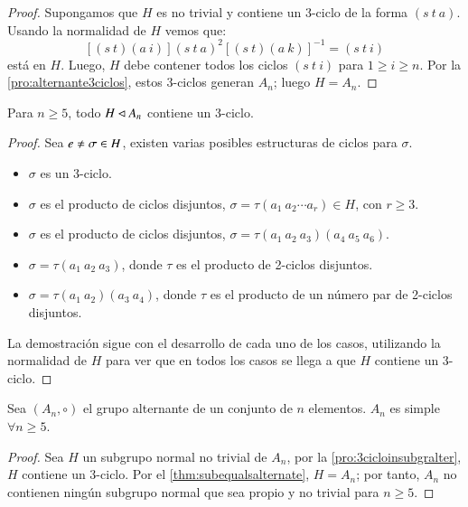 \begin{proof}
	Supongamos que $H$ es no trivial y contiene un 3-ciclo de la forma $(s\ t\ a)$. Usando la normalidad de $H$ vemos que:
	\[
	[(s\ t)(a\ i)](s\ t\ a)^2[(s\ t)(a\ k)]^{-1} = (s\ t\ i)
	\]
	está en $H$. Luego, $H$ debe contener todos los ciclos $(s\ t\ i)$ para $1 \geq i \geq n$. Por la \autoref{pro:alternante3ciclos}, estos 3-ciclos generan $A_n$; luego $H = A_n$.
\end{proof}
\begin{pro}
	\label{pro:3cicloinsubgralter}
	Para $n\geq 5$, todo $H \lhd A_n$ contiene un 3-ciclo.
\end{pro}
\begin{proof}
	Sea $e \not \eq \sigma \in H$, existen varias posibles estructuras de ciclos para $\sigma$.
	\begin{itemize}
		\item $\sigma$ es un 3-ciclo.
		\item $\sigma$ es el producto de ciclos disjuntos, $\sigma = \tau(a_1\ a_2 \cdots a_r)\in H$, con $r\geq 3$.
		\item $\sigma$ es el producto de ciclos disjuntos, $\sigma = \tau(a_1\ a_2\ a_3)(a_4\ a_5\ a_6)$.
		\item $\sigma = \tau(a_1\ a_2\ a_3)$, donde $\tau$ es el producto de 2-ciclos disjuntos.
		\item $\sigma = \tau(a_1\ a_2)(a_3\ a_4)$, donde $\tau$ es el producto de un número par de 2-ciclos disjuntos.
	\end{itemize}
	La demostración sigue con el desarrollo de cada uno de los casos, utilizando la normalidad de $H$ para ver que en todos los casos se llega a que $H$ contiene un 3-ciclo.
\end{proof}
\begin{thm}
	Sea $(A_n, \circ)$ el grupo alternante de un conjunto de $n$ elementos. $A_n$ es simple $\forall n \geq 5$.
\end{thm}
\begin{proof}
	Sea $H$ un subgrupo normal no trivial de $A_n$, por la  \autoref{pro:3cicloinsubgralter}, $H$ contiene un 3-ciclo. Por el  \autoref{thm:subequalsalternate}, $H = A_n$; por tanto, $A_n$ no contienen ningún subgrupo normal que sea propio y no trivial para $n\geq 5$.
\end{proof}

